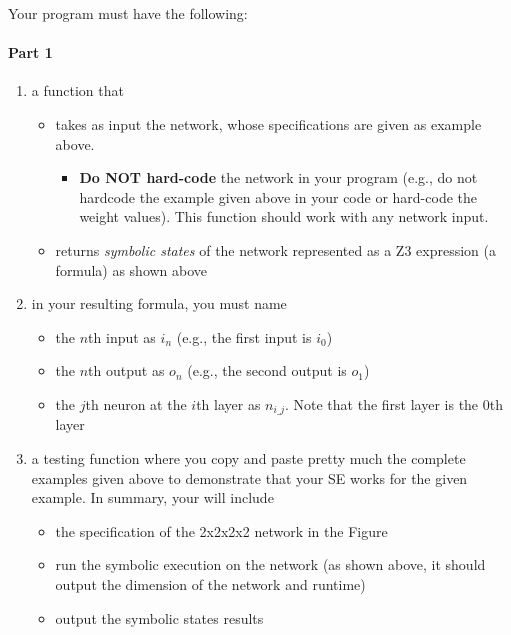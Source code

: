 Your program must have the following:

\paragraph{Part 1}

\begin{enumerate}
\item a function  that 
    \begin{itemize}
    \item takes as input the network, whose specifications are given as example above.
        \begin{itemize}
        \item \textbf{Do NOT hard-code} the network in your program (e.g., do not hardcode the example given above in your code or hard-code the weight values). This function should work with any network input.
        \end{itemize}
    \item returns \textit{symbolic states} of the network represented as a Z3 expression (a formula) as shown above
    \end{itemize}
\item in your resulting formula, you must name 
    \begin{itemize}
    \item the $n$th input  as $i_n$ (e.g., the first input is $i_0$)
    \item the $n$th output as $o_n$ (e.g., the second output is $o_1$)
    \item the $j$th neuron at the $i$th layer as $n_{i\_j}$.  Note that the first layer is the $0$th layer
    \end{itemize}
\item a testing function  where you copy and paste pretty much the complete examples given above to demonstrate that your SE works for the given example. In summary, your  will include
    \begin{itemize}
    \item the specification of the 2x2x2x2 network in the Figure
    \item run the symbolic execution on the network  (as shown above, it should output the dimension of the network and runtime)
    \item output the symbolic states results

\end{itemize}
\end{enumerate}
